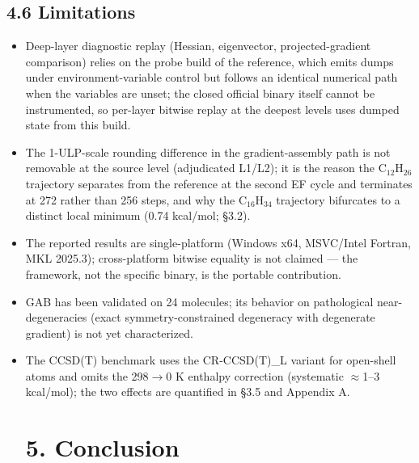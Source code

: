 \documentclass[preprint,12pt]{elsarticle}
\begin{document}
\subsection{4.6 Limitations}
\begin{itemize}
\item Deep-layer diagnostic replay (Hessian, eigenvector, projected-gradient comparison) relies on the probe build of the reference, which emits dumps under environment-variable control but follows an identical numerical path when the variables are unset; the closed official binary itself cannot be instrumented, so per-layer bitwise replay at the deepest levels uses dumped state from this build.
\item The 1-ULP-scale rounding difference in the gradient-assembly path is not removable at the source level (adjudicated L1/L2); it is the reason the C$_{12}$H$_{26}$ trajectory separates from the reference at the second EF cycle and terminates at 272 rather than 256 steps, and why the C$_{16}$H$_{34}$ trajectory bifurcates to a distinct local minimum (0.74 kcal/mol; \S{}3.2).
\item The reported results are single-platform (Windows x64, MSVC/Intel Fortran, MKL 2025.3); cross-platform bitwise equality is not claimed --- the framework, not the specific binary, is the portable contribution.
\item GAB has been validated on 24 molecules; its behavior on pathological near-degeneracies (exact symmetry-constrained degeneracy with degenerate gradient) is not yet characterized.
\item The CCSD(T) benchmark uses the CR-CCSD(T)\_L variant for open-shell atoms and omits the 298$\rightarrow$0 K enthalpy correction (systematic $\approx$1--3 kcal/mol); the two effects are quantified in \S{}3.5 and Appendix A.


\section{5. Conclusion}

\end{itemize}
\end{document}
